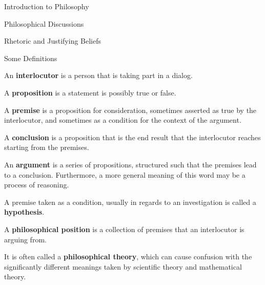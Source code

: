 \begin{chapter}{Introduction to Philosophy}
\begin{section}{Philosophical Discussions}
\begin{subsection}{Rhetoric and Justifying Beliefs}
            \begin{subsubsection}{Some Definitions}
                
                \begin{definition}
                    An \textbf{interlocutor} is a person that is taking part in a dialog.
                \end{definition}
                    
                \begin{definition}
                    A \textbf{proposition} is a statement is possibly true or false.
                \end{definition}
                    
                \begin{definition}
                    A \textbf{premise} is a proposition for consideration, sometimes asserted as true by the interlocutor, and sometimes as a condition for the context of the argument.
                \end{definition}
                    
                \begin{definition}
                    A \textbf{conclusion} is a proposition that is the end result that the interlocutor reaches starting from the premises.
                \end{definition}
                    
                \begin{definition}
                    An \textbf{argument} is a series of propositions, structured such that the premises lead to a conclusion. Furthermore, a more general meaning of this word may be a process of reasoning.
                \end{definition}
                    
                \begin{definition}
                    A premise taken as a condition, usually in regards to an investigation is called a \textbf{hypothesis}.
                \end{definition}
                    
                \begin{definition}
                    A \textbf{philosophical position} is a collection of premises that an interlocutor is arguing from.
                        
                    It is often called a \textbf{philosophical theory}, which can cause confusion with the significantly different meanings taken by scientific theory and mathematical theory. 
                        

\end{definition}
\end{subsubsection}
\end{subsection}
\end{section}
\end{chapter}
